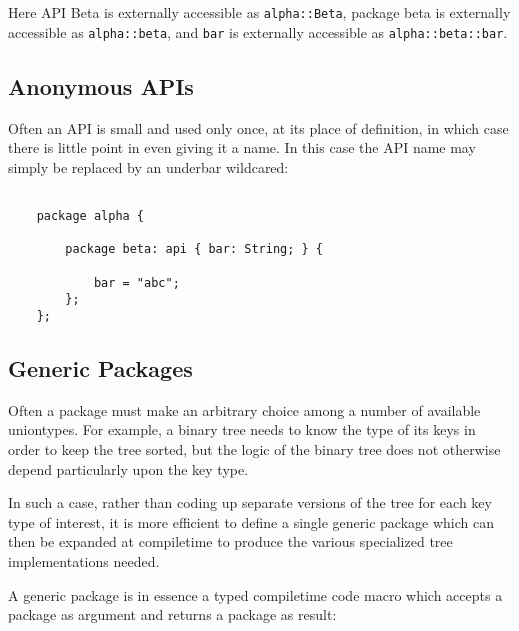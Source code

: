 Here API Beta is externally accessible as {\tt alpha::Beta}, 
package beta is externally accessible as {\tt alpha::beta}, 
and {\tt bar} is externally accessible as  {\tt alpha::beta::bar}.

\cutend*

\subsection{Anonymous APIs}
\label{section:ref:anonymous-apis}

Often an API is small and used only once, at its 
place of definition, in which case there is little 
point in even giving it a name.  In this case the 
API name may simply be replaced by an underbar 
wildcared:

\begin{verbatim}

    package alpha {

        package beta: api { bar: String; } {

            bar = "abc";
        };
    };

\end{verbatim}

\cutend*

\subsection{Generic Packages}
\label{section:ref:generic-packages}

Often a package must make an arbitrary choice among 
a number of available uniontypes.  For example, a 
binary tree needs to know the type of its keys in 
order to keep the tree sorted, but the logic of the 
binary tree does not otherwise depend particularly upon 
the key type. 

In such a case, rather than coding  up separate 
versions of the tree for each key type of interest, 
it is more efficient to define a single generic 
package which can then be expanded at compiletime 
to produce the various specialized tree implementations 
needed.

A generic package is in essence a typed compiletime 
code macro which accepts a package as argument and 
returns a package as result:


